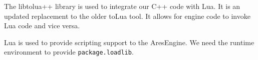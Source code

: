 

\startitemize[4]

The libtolua++ library is used to integrate our C++ code with Lua. It is an updated replacement to the older toLua tool. It allows for engine code to invoke Lua code and vice versa.


Lua is used to provide scripting support to the AresEngine. We need the runtime environment to provide {\tt package.loadlib}.
\stopitemize

